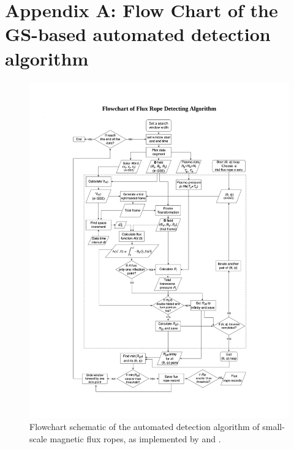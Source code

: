 

\chapter{Appendix A: Flow Chart of the GS-based automated detection algorithm}\label{ch:gs-flowchart}

\renewcommand{\thechapter}{A}


\begin{figure}
    \centering
    \includegraphics[width=\textwidth]{Figures/Flowchart of Flux Rope Detecting Algorithm.pdf}
    \caption[Flowchart of GS-reconstruction based automated detection algorithm]{Flowchart schematic of the automated detection algorithm of small-scale magnetic flux ropes, as implemented by \cite{Hu:2018} and \cite{Zheng:2018}.}
    \label{fig:flowchart}
\end{figure}